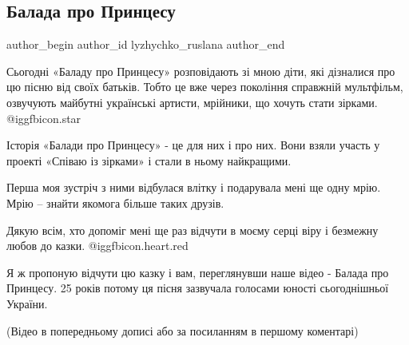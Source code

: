  
 
 
 
 
 
\subsection{Балада про Принцесу}
\label{sec:15_01_2022.fb.lyzhychko_ruslana.1.balada_pro_princessu}
 
\ifcmt
 author_begin
   author_id lyzhychko_ruslana
 author_end
\fi

Сьогодні «Баладу про Принцесу» розповідають зі мною діти, які дізналися про цю
пісню від своїх батьків. Тобто це вже через покоління справжній мультфільм,
озвучують майбутні українські артисти, мрійники, що хочуть стати зірками.
@igg{fbicon.star}


Історія «Балади про Принцесу» - це для них і про них. Вони взяли участь у
проекті «Співаю із зірками» і стали в ньому найкращими. 

Перша моя зустріч з ними відбулася влітку і подарувала мені ще одну мрію. Мрію
– знайти якомога більше таких друзів.


Дякую всім, хто допоміг мені ще раз відчути в моєму серці віру і безмежну любов
до казки. @igg{fbicon.heart.red}

Я ж пропоную відчути цю казку і вам, переглянувши наше відео - Балада про
Принцесу. 25 років потому ця пісня зазвучала голосами юності сьогоднішньої
України. 

(Відео в попередньому дописі або за посиланням в першому коментарі)
